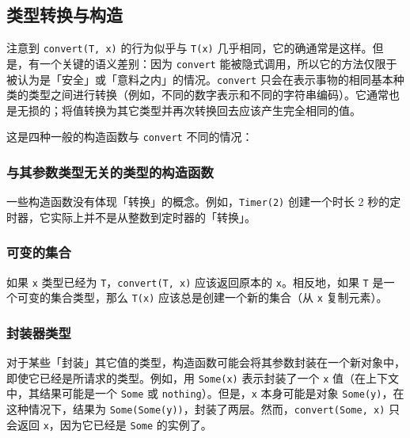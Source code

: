\hypertarget{11541557100875125079}{}


\subsection{类型转换与构造}



注意到 \texttt{convert(T, x)} 的行为似乎与 \texttt{T(x)} 几乎相同，它的确通常是这样。但是，有一个关键的语义差别：因为 \texttt{convert} 能被隐式调用，所以它的方法仅限于被认为是「安全」或「意料之内」的情况。\texttt{convert} 只会在表示事物的相同基本种类的类型之间进行转换（例如，不同的数字表示和不同的字符串编码）。它通常也是无损的；将值转换为其它类型并再次转换回去应该产生完全相同的值。



这是四种一般的构造函数与 \texttt{convert} 不同的情况：



\hypertarget{17931790162561418365}{}


\subsubsection{与其参数类型无关的类型的构造函数}



一些构造函数没有体现「转换」的概念。例如，\texttt{Timer(2)} 创建一个时长 2 秒的定时器，它实际上并不是从整数到定时器的「转换」。



\hypertarget{8367796589961400339}{}


\subsubsection{可变的集合}



如果 \texttt{x} 类型已经为 \texttt{T}，\texttt{convert(T, x)} 应该返回原本的 \texttt{x}。相反地，如果 \texttt{T} 是一个可变的集合类型，那么 \texttt{T(x)} 应该总是创建一个新的集合（从 \texttt{x} 复制元素）。



\hypertarget{13864114731640700485}{}


\subsubsection{封装器类型}



对于某些「封装」其它值的类型，构造函数可能会将其参数封装在一个新对象中，即使它已经是所请求的类型。例如，用 \texttt{Some(x)} 表示封装了一个 \texttt{x} 值（在上下文中，其结果可能是一个 \texttt{Some} 或 \texttt{nothing}）。但是，\texttt{x} 本身可能是对象 \texttt{Some(y)}，在这种情况下，结果为 \texttt{Some(Some(y))}，封装了两层。然而，\texttt{convert(Some, x)} 只会返回 \texttt{x}，因为它已经是 \texttt{Some} 的实例了。



